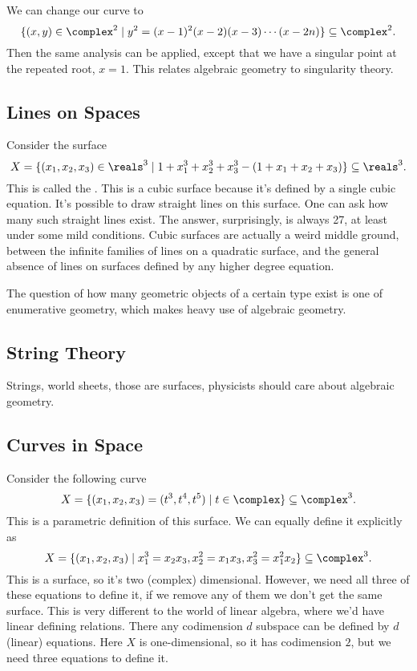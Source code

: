 \documentclass[fleqn]{NotesClass}
\begin{document}
    We can change our curve to
    \begin{equation}
        \{(x, y) \in \complex^2 \mid y^2 = (x - 1)^2(x - 2)(x - 3) \dotsm (x - 2n)\} \subseteq \complex^2.
    \end{equation}
    Then the same analysis can be applied, except that we have a singular point at the repeated root, \(x = 1\).
    This relates algebraic geometry to singularity theory.
    
    \subsection{Lines on Spaces}
    Consider the surface
    \begin{equation}
        X = \{(x_1, x_2, x_3) \in \reals^3 \mid 1 + x_1^3 + x_2^3 + x_3^3 - (1 + x_1 + x_2 + x_3)\} \subseteq \reals^3.
    \end{equation}
    This is called the .
    This is a cubic surface because it's defined by a single cubic equation.
    It's possible to draw straight lines on this surface.
    One can ask how many such straight lines exist.
    The answer, surprisingly, is always 27, at least under some mild conditions.
    Cubic surfaces are actually a weird middle ground, between the infinite families of lines on a quadratic surface, and the general absence of lines on surfaces defined by any higher degree equation.
    
    The question of how many geometric objects of a certain type exist is one of enumerative geometry, which makes heavy use of algebraic geometry.
    
    \subsection{String Theory}
    Strings, world sheets, those are surfaces, physicists should care about algebraic geometry.
    
    \subsection{Curves in Space}
    Consider the following curve
    \begin{equation}
        X = \{(x_1, x_2, x_3) = (t^3, t^4, t^5) \mid t \in \complex\} \subseteq \complex^3.
    \end{equation}
    This is a parametric definition of this surface.
    We can equally define it explicitly as
    \begin{equation}
        X = \{(x_1, x_2, x_3) \mid x_1^3 = x_2x_3, x_2^2 = x_1x_3, x_3^2 = x_1^2x_2\} \subseteq \complex^3.
    \end{equation}
    This is a surface, so it's two (complex) dimensional.
    However, we need all three of these equations to define it, if we remove any of them we don't get the same surface.
    This is very different to the world of linear algebra, where we'd have linear defining relations.
    There any codimension \(d\) subspace can be defined by \(d\) (linear) equations.
    Here \(X\) is one-dimensional, so it has codimension \(2\), but we need three equations to define it.
    
\end{document}

